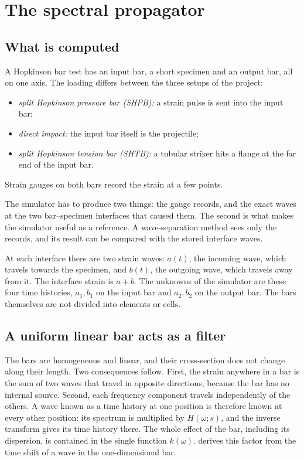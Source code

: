 \documentclass[11pt,a4paper,numbers=noenddot,abstract=true]{scrartcl}
\begin{document}
\section{The spectral propagator}
\label{sec:propagator}

\subsection{What is computed}

A Hopkinson bar test has an input bar, a short specimen and an output bar, all on one axis. The loading differs
between the three setups of the project:
\begin{itemize}
  \item \emph{split Hopkinson pressure bar (SHPB):} a strain pulse is sent into the input bar;
  \item \emph{direct impact:} the input bar itself is the projectile;
  \item \emph{split Hopkinson tension bar (SHTB):} a tubular striker hits a flange at the far end of the input bar.
\end{itemize}
Strain gauges on both bars record the strain at a few points.

The simulator has to produce two things: the gauge records, and the exact waves at the two bar--specimen
interfaces that caused them. The second is what makes the simulator useful as a reference. A wave-separation
method sees only the records, and its result can be compared with the stored interface waves.

At each interface there are two strain waves: $a(t)$, the incoming wave, which travels towards the specimen, and
$b(t)$, the outgoing wave, which travels away from it. The interface strain is $a + b$. The unknowns of the
simulator are these four time histories, $a_1, b_1$ on the input bar and $a_2, b_2$ on the output bar. The bars
themselves are not divided into elements or cells.

\subsection{A uniform linear bar acts as a filter}

The bars are homogeneous and linear, and their cross-section does not change along their length. Two
consequences follow. First, the strain anywhere in a bar is the sum of two waves that travel in opposite
directions, because the bar has no internal source. Second, each frequency component travels independently of
the others. A wave known as a time history at one position is therefore known at every other position: its
spectrum is multiplied by $H(\omega; s)$, and the inverse transform gives its time history there. The whole effect
of the bar, including its dispersion, is contained in the single function $k(\omega)$.  derives this factor from the time shift of a
wave in the one-dimensional bar.
\end{document}
